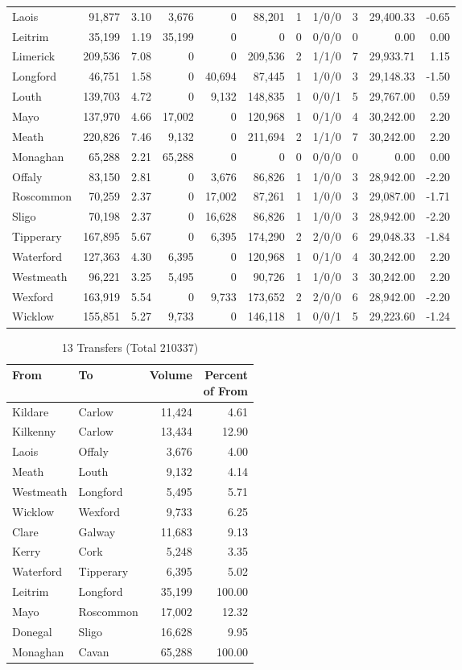 \documentclass[a4paper]{article}
\begin{document}
\begin{longtable}{lrrrrrrlrrr}
Laois&91,877& 3.10&3,676&0&88,201&1&1/0/0&3&29,400.33&-0.65\\ 
Leitrim&35,199& 1.19&35,199&0&0&0&0/0/0&0& 0.00& 0.00\\ 
Limerick&209,536& 7.08&0&0&209,536&2&1/1/0&7&29,933.71& 1.15\\ 
Longford&46,751& 1.58&0&40,694&87,445&1&1/0/0&3&29,148.33&-1.50\\ 
Louth&139,703& 4.72&0&9,132&148,835&1&0/0/1&5&29,767.00& 0.59\\ 
Mayo&137,970& 4.66&17,002&0&120,968&1&0/1/0&4&30,242.00& 2.20\\ 
Meath&220,826& 7.46&9,132&0&211,694&2&1/1/0&7&30,242.00& 2.20\\ 
Monaghan&65,288& 2.21&65,288&0&0&0&0/0/0&0& 0.00& 0.00\\ 
Offaly&83,150& 2.81&0&3,676&86,826&1&1/0/0&3&28,942.00&-2.20\\ 
Roscommon&70,259& 2.37&0&17,002&87,261&1&1/0/0&3&29,087.00&-1.71\\ 
Sligo&70,198& 2.37&0&16,628&86,826&1&1/0/0&3&28,942.00&-2.20\\ 
Tipperary&167,895& 5.67&0&6,395&174,290&2&2/0/0&6&29,048.33&-1.84\\ 
Waterford&127,363& 4.30&6,395&0&120,968&1&0/1/0&4&30,242.00& 2.20\\ 
Westmeath&96,221& 3.25&5,495&0&90,726&1&1/0/0&3&30,242.00& 2.20\\ 
Wexford&163,919& 5.54&0&9,733&173,652&2&2/0/0&6&28,942.00&-2.20\\ 
Wicklow&155,851& 5.27&9,733&0&146,118&1&0/0/1&5&29,223.60&-1.24\\ 
\end{longtable}

\begin{table}[htbp]
\caption{13 Transfers (Total 210337)}
\centering
\begin{tabular}{llrr} \toprule
From &To &Volume &\shortstack{Percent\\of From} \\ \midrule
Kildare&Carlow&11,424& 4.61\\ 
Kilkenny&Carlow&13,434&12.90\\ 
Laois&Offaly&3,676& 4.00\\ 
Meath&Louth&9,132& 4.14\\ 
Westmeath&Longford&5,495& 5.71\\ 
Wicklow&Wexford&9,733& 6.25\\ 
Clare&Galway&11,683& 9.13\\ 
Kerry&Cork&5,248& 3.35\\ 
Waterford&Tipperary&6,395& 5.02\\ 
Leitrim&Longford&35,199&100.00\\ 
Mayo&Roscommon&17,002&12.32\\ 
Donegal&Sligo&16,628& 9.95\\ 
Monaghan&Cavan&65,288&100.00\\ 
\bottomrule
\end{tabular}
\end{table}
\end{document}
